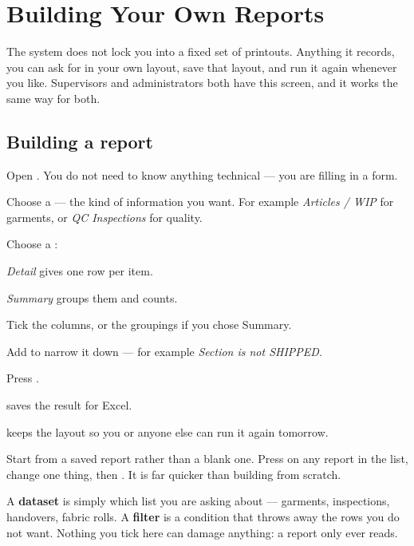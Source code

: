 \chapter{Building Your Own Reports}
\label{ch:reports}

The system does not lock you into a fixed set of printouts. Anything it records,
you can ask for in your own layout, save that layout, and run it again whenever
you like. Supervisors and administrators both have this screen, and it works the
same way for both.

\section{Building a report}

Open . You do not need to know anything technical --- you are
filling in a form.


\begin{steps}
  \item Choose a  --- the kind of information you want. For
        example \emph{Articles / WIP} for garments, or \emph{QC Inspections} for
        quality.
  \item Choose a :
        \begin{bullets}
          \item \emph{Detail} gives one row per item.
          \item \emph{Summary} groups them and counts.
        \end{bullets}
  \item Tick the columns, or the groupings if you chose Summary.
  \item Add  to narrow it down --- for example
        \emph{Section is not SHIPPED}.
  \item Press .
\end{steps}


\begin{bullets}
  \item {} saves the result for Excel.
  \item {} keeps the layout so you or anyone else can run it
        again tomorrow.
\end{bullets}

\begin{tipbox}
Start from a saved report rather than a blank one. Press  on any report
in the list, change one thing, then . It is far quicker than
building from scratch.
\end{tipbox}

\begin{plainwords}
A \textbf{dataset} is simply which list you are asking about --- garments,
inspections, handovers, fabric rolls. A \textbf{filter} is a condition that
throws away the rows you do not want. Nothing you tick here can damage anything:
a report only ever reads.
\end{plainwords}
